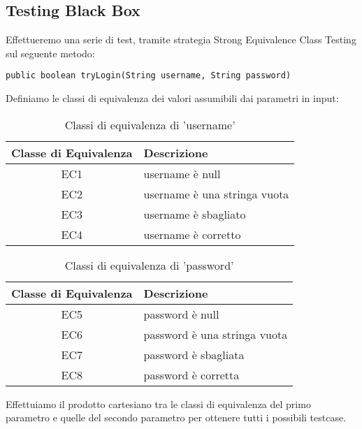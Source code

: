 \subsection{Testing Black Box}
Effettueremo una serie di test, tramite strategia Strong Equivalence Class Testing sul seguente metodo:
\begin{lstlisting}
public boolean tryLogin(String username, String password)
\end{lstlisting}
Definiamo le classi di equivalenza dei valori assumibili dai parametri in input:
\begin{table}[H]
    \centering
    \footnotesize
    \caption{Classi di equivalenza di 'username'}
    \begin{tabularx}{\textwidth}{|c|X|}
        \hline
        Classe di Equivalenza & Descrizione\\
        \hline
        EC1 & username è null  \\
        \hline
        EC2 & username è una stringa vuota\\
        \hline
        EC3 &  username è sbagliato\\
        \hline
        EC4 & username è corretto\\
        \hline
    \end{tabularx}
    \setlength{\tabcolsep}{8pt}
    \renewcommand{\arraystretch}{1.5}
\end{table}
\begin{table}[H]
    \centering
    \footnotesize
    \caption{Classi di equivalenza di 'password'}
    \begin{tabularx}{\textwidth}{|c|X|}
        \hline
        Classe di Equivalenza & Descrizione\\
        \hline
        EC5 & password è null  \\
        \hline
        EC6 & password è una stringa vuota\\
        \hline
        EC7 &  password è sbagliata\\
        \hline
        EC8 & password è corretta\\
        \hline
    \end{tabularx}
    \setlength{\tabcolsep}{8pt}
    \renewcommand{\arraystretch}{1.5}
\end{table}
Effettuiamo il prodotto cartesiano tra le classi di equivalenza del primo parametro 
e quelle del secondo parametro per ottenere tutti i possibili testcase.

